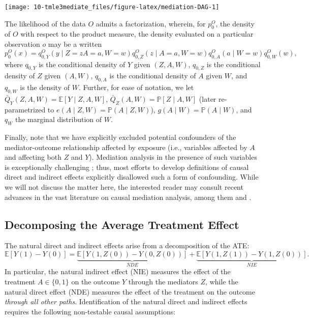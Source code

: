 \documentclass[12pt, krantz2,]{krantz}
\theoremstyle{definition}
\theoremstyle{definition}
\theoremstyle{definition}
\renewcommand{\P}{\mathbb{P}}
\newcommand{\E}{\mathbb{E}}
\newcommand{\1}{\mathbbm{1}}
\begin{document}
\begin{center}\texttt{[image: 10-tmle3mediate\_files/figure-latex/mediation-DAG-1]} \end{center}

The likelihood of the data \(O\) admits a factorization, wherein, for \(p_0^O\),
the density of \(O\) with respect to the product measure, the density evaluated
on a particular observation \(o\) may be a written
\begin{equation}
  p_0^O(x) = q^O_{0,Y}(y \mid Z = z A = a, W = w)
    q^O_{0,Z}(z \mid A = a, W = w)
    q^O_{0,A}(a \mid W = w)
    q^O_{0,W}(w),
  \label{eq:likelihood-factorization-mediate}
\end{equation}
where \(q_{0, Y}\) is the conditional density of \(Y\) given \((Z, A, W)\), \(q_{0, Z}\)
is the conditional density of \(Z\) given \((A, W)\), \(q_{0, A}\) is the conditional
density of \(A\) given \(W\), and \(q_{0, W}\) is the density of \(W\). Further, for
ease of notation, we let \(\bar{Q}_Y(Z, A, W) = \E[Y \mid Z, A, W]\),
\(\bar{Q}_Z(A, W) = \P[Z \mid A, W]\) (later re-parametrized to \(e(A \mid Z, W) = \P(A \mid Z, W)\)), \(g(A \mid W) = \P(A \mid W)\), and \(q_W\) the marginal
distribution of \(W\).

Finally, note that we have explicitly excluded potential confounders of the
mediator-outcome relationship affected by exposure (i.e., variables affected by
\(A\) and affecting both \(Z\) and \(Y\)). Mediation analysis in the presence of such
variables is exceptionally challenging \citep{avin2005identifiability}; thus, most
efforts to develop definitions of causal direct and indirect effects explicitly
disallowed such a form of confounding. While we will not discuss the matter
here, the interested reader may consult recent advances in the vast literature
on causal mediation analysis, among them \citet{diaz2020nonparametric} and
\citet{hejazi2021nonparametric}.

\hypertarget{decomposing-the-average-treatment-effect}{%
\subsection{Decomposing the Average Treatment Effect}\label{decomposing-the-average-treatment-effect}}

The natural direct and indirect effects arise from a decomposition of the ATE:
\begin{equation*}
  \E[Y(1) - Y(0)] =
    \underbrace{\E[Y(1, Z(0)) - Y(0, Z(0))]}_{NDE} +
    \underbrace{\E[Y(1, Z(1)) - Y(1, Z(0))]}_{NIE}.
\end{equation*}
In particular, the natural indirect effect (NIE) measures the effect of the
treatment \(A \in \{0, 1\}\) on the outcome \(Y\) through the mediators \(Z\), while
the natural direct effect (NDE) measures the effect of the treatment on the
outcome \emph{through all other paths}. Identification of the natural direct and
indirect effects requires the following non-testable causal assumptions:
\end{document}
